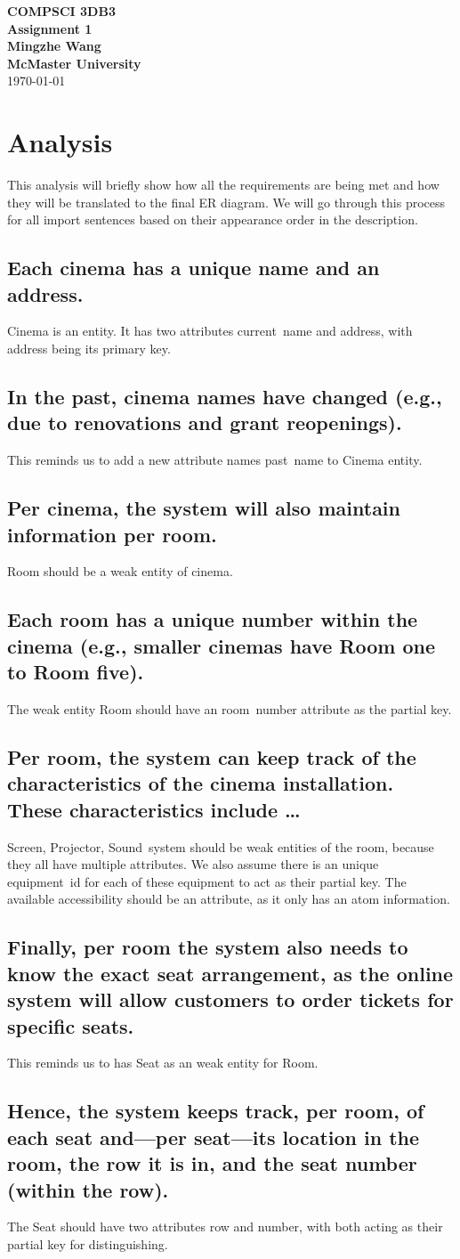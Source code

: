 \documentclass[11pt,fleqn]{exam}
\newcommand{\mn}[1]{\mbox{\sf #1}}
\newcommand{\sbs}{\subsection*}
\begin{document}
	
	\begin{center}
		
		{\large \textbf{COMPSCI 3DB3}}\\[2mm]
		{\huge \textbf{Assignment 1}}\\[6mm]
		{\large \textbf{Mingzhe Wang}}\\[2mm]
		{\large \textbf{McMaster University}}\\[6mm]
		{\large \today}
		
	\end{center}
	
	\medskip
		
	
	\section*{Analysis}
	This analysis will briefly show how all the requirements are being met and how they will be translated to the final ER diagram.  We will go through this process for all import sentences based on their appearance order in the description. 
	\sbs{Each cinema has a unique name and an address.}
	\mn{Cinema} is an entity. It has two attributes \mn{current name} and \mn{address}, with \mn{address} being its primary key.
	\sbs{In the past, cinema names have changed (e.g., due to renovations and grant reopenings). }
	This reminds us to add a new attribute names \mn{past name} to \mn{Cinema} entity.
	\sbs{Per cinema, the system will also maintain information per room. }
	\mn{Room} should be a weak entity of cinema.
	\sbs{Each room has a unique number within the cinema (e.g., smaller cinemas have Room one to Room five). }
	The weak entity \mn{Room} should have an \mn{room number} attribute as the partial key.
	\sbs{Per room, the system can keep track of the characteristics of the cinema installation.  These characteristics include \ldots}
	\mn{Screen}, \mn{Projector}, \mn{Sound system} should be weak entities of the room, because they all have multiple attributes. We also assume there is an unique \mn{equipment id} for each of these equipment to act as their partial key. The available \mn{accessibility} should be an attribute, as it only has an atom information.
	\sbs{Finally, per room the system also needs to know the exact seat arrangement, as the online system will allow customers to order tickets for specific seats.}
	This reminds us to has \mn{Seat} as an weak entity for \mn{Room}.
	\sbs{Hence, the system keeps track, per room, of each seat and—per seat—its location in the room, the row it is in, and the seat number (within the row).}
	The \mn{Seat} should have two attributes \mn{row} and \mn{number}, with both acting as their partial key for distinguishing.
\end{document}
